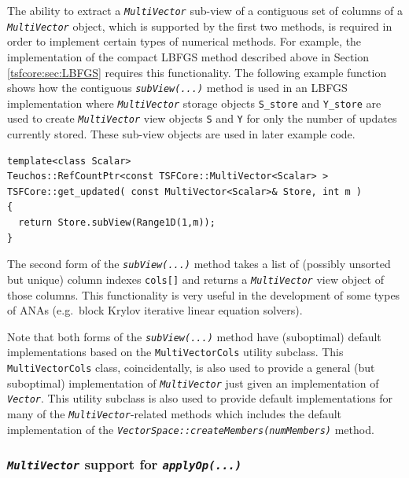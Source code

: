 {}\noindent{}The ability to extract a \texttt{\textit{Multi\-Vector}} sub-view of a
contiguous set of columns of a \texttt{\textit{Multi\-Vector}} object,
which is supported by the first two methods, is required in order to
implement certain types of numerical methods.  For example, the
implementation of the compact LBFGS method described above in Section
\ref{tsfcore:sec:LBFGS} requires this functionality.
The following example function shows how the contiguous
\texttt{\textit{subView(...)}} method is used in an LBFGS
implementation where \texttt{\textit{Multi\-Vector}} storage objects
\texttt{S\_store} and \texttt{Y\_store} are used to create
\texttt{\textit{Multi\-Vector}} view objects \texttt{S} and \texttt{Y}
for only the number of updates currently stored.  These sub-view
objects are used in later example code.

{\scriptsize\begin{verbatim}
template<class Scalar>
Teuchos::RefCountPtr<const TSFCore::MultiVector<Scalar> >
TSFCore::get_updated( const MultiVector<Scalar>& Store, int m )
{
  return Store.subView(Range1D(1,m));
}
\end{verbatim}}

The second form of the \texttt{\textit{subView(...)}} method takes a
list of (possibly unsorted but unique) column indexes \texttt{cols[]}
and returns a \texttt{\textit{Multi\-Vector}} view object of those
columns.  This functionality is very useful in the development of some
types of ANAs (e.g.~block Krylov iterative linear equation solvers).

Note that both forms of the \texttt{\textit{subView(...)}} method have
(suboptimal) default implementations based on the
\texttt{MultiVectorCols} utility subclass.  This
\texttt{MultiVectorCols} class, coincidentally, is also used
to provide a general (but suboptimal) implementation of
\texttt{\textit{Multi\-Vector}} just given an implementation of
\texttt{\textit{Vector}}.  This utility subclass is also used to
provide default implementations for many of the
\texttt{\textit{Multi\-Vector}}-related methods which includes
the default implementation of the
\texttt{\textit{VectorSpace\-::createMembers(numMembers)}} method.

%
\subsubsection{\texttt{\textit{Multi\-Vector}} support for \texttt{\textit{applyOp(\-...)}}}
\label{tsfcore:sec:multi_vec_apply_op}
%

